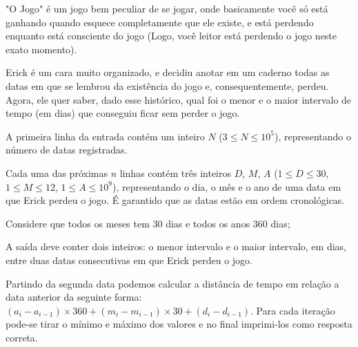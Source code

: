 "O Jogo" é um jogo bem peculiar de se jogar, onde basicamente você só está ganhando quando esquece completamente que ele existe, e está perdendo enquanto está consciente do jogo (Logo, você leitor está perdendo o jogo neste exato momento).  

Erick é um cara muito organizado, e decidiu anotar em um caderno todas as datas em que se lembrou da existência do jogo e, consequentemente, perdeu. Agora, ele quer saber, dado esse histórico, qual foi o menor e o maior intervalo de tempo (em dias) que conseguiu ficar sem perder o jogo.

A primeira linha da entrada contém um inteiro $N$ ($3 \leq N \leq 10^5$), representando o número de datas registradas.  

Cada uma das próximas $n$ linhas contém três inteiros $D$, $M$, $A$ ($1 \leq D \leq 30$, $1 \leq M \leq 12$, $1 \leq A \leq 10^9$), representando o dia, o mês e o ano de uma data em que Erick perdeu o jogo. É garantido que as datas estão em ordem cronológicas.

Considere que todos os meses tem $30$ dias e todos os anos $360$ dias;

A saída deve conter dois inteiros: o menor intervalo e o maior intervalo, em dias, entre duas datas consecutivas em que Erick perdeu o jogo.

Partindo da segunda data podemos calcular a distância de tempo em relação a data anterior da seguinte forma: $(a_i - a_{i-1}) \times 360 + (m_i - m_{i-1}) \times 30 + (d_i - d_{i-1})$.
Para cada iteração pode-se tirar o mínimo e máximo dos valores e no final imprimi-los como resposta correta.


